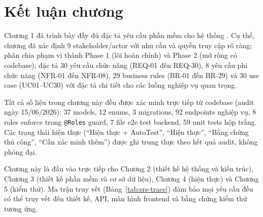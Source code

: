 

\section{Kết luận chương}
\label{sec:srs-conclusion}

Chương 1 đã trình bày đầy đủ đặc tả yêu cầu phần mềm cho hệ thống \projecttitle{}. Cụ thể, chương đã xác định 9 stakeholder/actor với nhu cầu và quyền truy cập rõ ràng; phân chia phạm vi thành Phase 1 (lõi hoàn chỉnh) và Phase 2 (mở rộng có codebase); đặc tả 30 yêu cầu chức năng (REQ-01 đến REQ-30), 8 yêu cầu phi chức năng (NFR-01 đến NFR-08), 29 business rules (BR-01 đến BR-29) và 30 use case (UC01--UC30) với đặc tả chi tiết cho các luồng nghiệp vụ quan trọng.

Tất cả số liệu trong chương này đều được xác minh trực tiếp từ codebase (audit ngày 15/06/2026): 37 models, 12 enums, 3 migrations, 92 endpoints nghiệp vụ, 8 roles enforce trong \texttt{@Roles} guard, 7 file e2e test backend, 59 unit tests hộp trắng. Các trạng thái hiện thực (``Hiện thực + AutoTest'', ``Hiện thực'', ``Bằng chứng thủ công'', ``Cần xác minh thêm'') được ghi trung thực theo kết quả audit, không phóng đại.

Chương này là đầu vào trực tiếp cho Chương 2 (thiết kế hệ thống và kiến trúc), Chương 3 (thiết kế phần mềm và cơ sở dữ liệu), Chương 4 (hiện thực) và Chương 5 (kiểm thử). Ma trận truy vết (Bảng~\ref{tab:srs-trace}) đảm bảo mọi yêu cầu đều có thể truy vết đến thiết kế, API, màn hình frontend và bằng chứng kiểm thử tương ứng.

